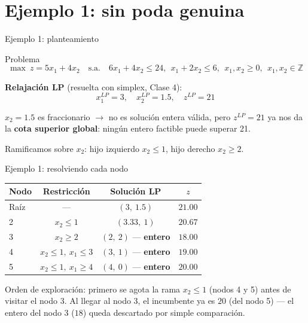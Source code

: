 \documentclass[aspectratio=169]{beamer}
\begin{document}
\section{Ejemplo 1: sin poda genuina}

\begin{frame}{Ejemplo 1: planteamiento}
\begin{block}{Problema}
\[
\max\ z=5x_1+4x_2 \quad\text{s.a.}\quad 6x_1+4x_2\leq24,\ \ x_1+2x_2\leq6,\ \ x_1,x_2\geq0,\ \ x_1,x_2\in\mathbb{Z}
\]
\end{block}

\textbf{Relajación LP} (resuelta con simplex, Clase 4):
\[
x_1^{LP}=3,\quad x_2^{LP}=1.5,\quad z^{LP}=21
\]

$x_2=1.5$ es fraccionario $\to$ no es solución entera válida, pero $z^{LP}=21$ ya nos da la \textbf{cota superior global}: ningún entero factible puede superar 21.

Ramificamos sobre $x_2$: hijo izquierdo $x_2\leq1$, hijo derecho $x_2\geq2$.
\end{frame}

\begin{frame}{Ejemplo 1: resolviendo cada nodo}
\begin{center}
\renewcommand{\arraystretch}{1.35}
\begin{tabular}{@{}lccc@{}}
\toprule
\textbf{Nodo} & \textbf{Restricción} & \textbf{Solución LP} & $z$\\
\midrule
Raíz & --- & $(3,\ 1.5)$ & $21.00$\\
2 & $x_2\leq1$ & $(3.33,\ 1)$ & $20.67$\\
3 & $x_2\geq2$ & $(2,\ 2)$ --- \textbf{entero} & $18.00$\\
4 & $x_2\leq1,\ x_1\leq3$ & $(3,\ 1)$ --- \textbf{entero} & $19.00$\\
5 & $x_2\leq1,\ x_1\geq4$ & $(4,\ 0)$ --- \textbf{entero} & $\mathbf{20.00}$\\
\bottomrule
\end{tabular}
\end{center}

\vspace{0.25cm}
Orden de exploración: primero se agota la rama $x_2\leq1$ (nodos 4 y 5) antes de visitar el nodo 3. Al llegar al nodo 3, el incumbente ya es $20$ (del nodo 5) --- el entero del nodo 3 ($18$) queda descartado por simple comparación.
\end{frame}
\end{document}
